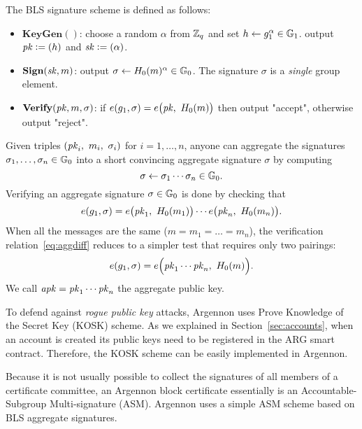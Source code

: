 The BLS signature scheme is defined as follows:

\begin{itemize}
    \item $\textbf{KeyGen}()$: choose a random $\alpha$ from $\mathbb{Z}_q$ and set $h \gets g_1^\alpha \in \mathbb{G}_1$.
    output $\mathit{pk} \mathrel{\mathop:}= (h)$ and $\mathit{sk} \mathrel{\mathop:}= (\alpha)$.
    \item $\textbf{Sign}(\mathit{sk}, m)$: output $\sigma \gets H_0(m)^\alpha \in \mathbb{G}_0$.
    The signature $\sigma$ is a \emph{single} group element.
    \item $\textbf{Verify}(\mathit{pk},m,\sigma)$: if $e(g_1, \sigma) = e\big(\PK,\ \Hm(m)\big)$  then output "accept",
    otherwise output "reject".
\end{itemize}

Given triples $(\PK_i,\ m_i,\ \sigma_i)$ for $i=1,\ldots,n$,
anyone can aggregate the signatures $\sigma_1,\ldots,\sigma_n \in \mathbb{G}_0$
into a short convincing aggregate signature $\sigma$ by computing
\begin{equation}
    \label{eq:agg}
    \sigma \gets \sigma_1 \cdots \sigma_n \in \mathbb{G}_0.
\end{equation}
Verifying an aggregate signature $\sigma \in \mathbb{G}_0$ is done by checking that
\begin{equation}
    \label{eq:aggdiff}
    e(g_1, \sigma) = e\big(\PK_1,\ \Hm(m_1)\big) \cdots e\big(\PK_n,\ \Hm(m_n)\big).
\end{equation}
When all the messages are the same ($m = m_1 = \ldots = m_n$), the verification relation~\eqref{eq:aggdiff} reduces to
a simpler test that requires only two pairings:
\begin{equation}
    \label{eq:aggsame}
    e(g_1, \sigma) = e\Big(\mathit{pk}_1 \cdots \mathit{pk}_n,\ H_0(m)\Big).
\end{equation}
We call $\mathit{apk}=\mathit{pk}_1 \cdots \mathit{pk}_n$ the aggregate public key.

To defend against \emph{rogue public key} attacks, Argennon uses Prove Knowledge of the Secret Key (KOSK) scheme. As we
explained in Section~\ref{sec:accounts}, when an account is created its public keys need to be registered in
the ARG smart contract. Therefore, the KOSK scheme can be easily implemented in Argennon.

Because it is not usually possible to collect the signatures of all members of a certificate committee, an Argennon
block certificate essentially is an Accountable-Subgroup Multi-signature (ASM). Argennon uses a simple ASM scheme
based on BLS aggregate signatures.

